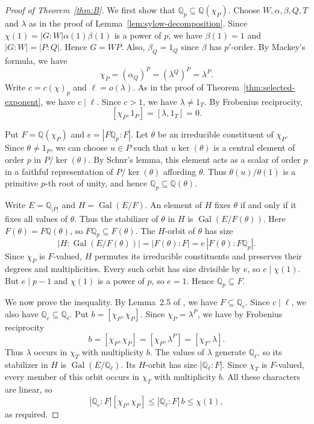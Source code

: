 \documentclass[reqno]{amsart}
\theoremstyle{definition}
\theoremstyle{remark}
\numberwithin{equation}{section}
\DeclareMathOperator{\Gal}{Gal}
\theoremstyle{plain}
\begin{document}
\begin{proof}[Proof of Theorem~\ref{thm:B}]
We first show that $\mathbb{Q}_p\subseteq\mathbb{Q}(\chi_P)$.
Choose $W,\alpha,\beta,Q,T$ and $\lambda$ as in the proof of
Lemma~\ref{lem:sylow-decomposition}.
Since $\chi(1)=|G:W|\alpha(1)\beta(1)$ is a power of $p$,
we have $\beta(1)=1$ and $|G:W|=|P:Q|$.
Hence $G=WP$.
Also, $\beta_Q=1_Q$ since $\beta$ has $p'$-order.
By Mackey's formula, we have
\[
  \chi_P=(\alpha_Q)^P=(\lambda^Q)^P=\lambda^P.
\]
Write $c=c(\chi)_p$ and $\ell=o(\lambda)$.
As in the proof of Theorem~\ref{thm:selected-exponent},
we have $c\mid\ell$.
Since $c>1$, we have $\lambda\neq1_T$.
By Frobenius reciprocity,
\[
  [\chi_P,1_P]=[\lambda,1_T]=0.
\]

Put $F=\mathbb{Q}(\chi_P)$ and $e=|F\mathbb{Q}_p:F|$.
Let $\theta$ be an irreducible constituent of $\chi_P$.
Since $\theta\neq1_P$, we can choose $u\in P$ such that
$u\ker(\theta)$ is a central element of order $p$ in
$P/\ker(\theta)$.
By Schur's lemma, this element acts as a scalar of order $p$
in a faithful representation of $P/\ker(\theta)$
affording $\theta$.
Thus $\theta(u)/\theta(1)$ is a primitive $p$-th root of unity,
and hence $\mathbb{Q}_p\subseteq\mathbb{Q}(\theta)$.

Write $E=\mathbb{Q}_{|P|}$ and $H=\Gal(E/F)$.
An element of $H$ fixes $\theta$ if and only if it fixes
all values of $\theta$.
Thus the stabilizer of $\theta$ in $H$ is $\Gal(E/F(\theta))$.
Here $F(\theta)=F\mathbb{Q}(\theta)$, so
$F\mathbb{Q}_p\subseteq F(\theta)$.
The $H$-orbit of $\theta$ has size
\[
  |H:\Gal(E/F(\theta))|
  =|F(\theta):F|
  =e\,|F(\theta):F\mathbb{Q}_p|.
\]
Since $\chi_P$ is $F$-valued, $H$ permutes its irreducible
constituents and preserves their degrees and multiplicities.
Every such orbit has size divisible by $e$, so $e\mid\chi(1)$.
But $e\mid p-1$ and $\chi(1)$ is a power of $p$,
so $e=1$.
Hence $\mathbb{Q}_p\subseteq F$.

We now prove the inequality.
By Lemma~2.5 of \cite{IN}, we have $F\subseteq\mathbb{Q}_c$.
Since $c\mid\ell$, we also have
$\mathbb{Q}_c\subseteq\mathbb{Q}_\ell$.
Put $b=[\chi_P,\chi_P]$.
Since $\chi_P=\lambda^P$, we have by Frobenius reciprocity
\[
  b=[\chi_P,\chi_P]=[\chi_P,\lambda^P]=[\chi_T,\lambda].
\]
Thus $\lambda$ occurs in $\chi_T$ with multiplicity $b$.
The values of $\lambda$ generate $\mathbb{Q}_\ell$, so its
stabilizer in $H$ is $\Gal(E/\mathbb{Q}_\ell)$.
Its $H$-orbit has size $|\mathbb{Q}_\ell:F|$.
Since $\chi_T$ is $F$-valued, every member of this orbit
occurs in $\chi_T$ with multiplicity $b$.
All these characters are linear, so
\[
  |\mathbb{Q}_c:F|[\chi_P,\chi_P]
  \leq |\mathbb{Q}_\ell:F|\,b
  \leq\chi(1),
\]
as required.
\end{proof}
\end{document}
